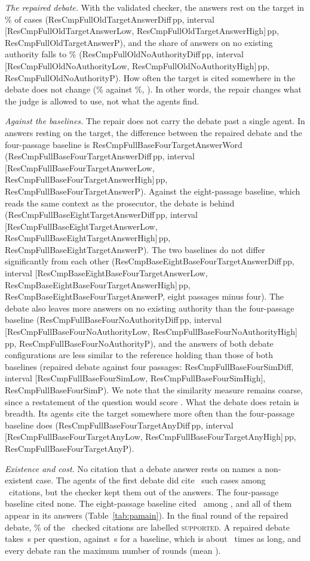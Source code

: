 \documentclass[conference]{IEEEtran}
\newcommand{\pp}{\,pp}
\newcommand{\cmp}[3]{\csname ResCmp#1#2Diff\endcsname#3, interval [\csname ResCmp#1#2Low\endcsname, \csname ResCmp#1#2High\endcsname]#3, \csname ResCmp#1#2P\endcsname}
\newcommand{\cmpword}[2]{\csname ResCmp#1#2Word\endcsname}
\begin{document}
\emph{The repaired debate.} With the validated checker, the answers rest on the target in \ResPaFullTargetAnswer\% of cases (\cmp{FullOld}{TargetAnswer}{\pp}), and the share of answers on no existing authority falls to \ResPaFullNoAuthority\% (\cmp{FullOld}{NoAuthority}{\pp}). How often the target is cited somewhere in the debate does not change (\ResPaFullTargetAny\% against \ResPaOldTargetAny\%, \ResCmpFullOldTargetAnyP). In other words, the repair changes what the judge is allowed to use, not what the agents find.

\emph{Against the baselines.} The repair does not carry the debate past a single agent. In answers resting on the target, the difference between the repaired debate and the four-passage baseline is \cmpword{FullBaseFour}{TargetAnswer} (\cmp{FullBaseFour}{TargetAnswer}{\pp}). Against the eight-passage baseline, which reads the same context as the prosecutor, the debate is behind (\cmp{FullBaseEight}{TargetAnswer}{\pp}). The two baselines do not differ significantly from each other (\cmp{BaseEightBaseFour}{TargetAnswer}{\pp}, eight passages minus four). The debate also leaves more answers on no existing authority than the four-passage baseline (\cmp{FullBaseFour}{NoAuthority}{\pp}), and the answers of both debate configurations are less similar to the reference holding than those of both baselines (repaired debate against four passages: \cmp{FullBaseFour}{Sim}{}). We note that the similarity measure remains coarse, since a restatement of the question would score \ResPaSimQuestion. What the debate does retain is breadth. Its agents cite the target somewhere more often than the four-passage baseline does (\cmp{FullBaseFour}{TargetAny}{\pp}).

\emph{Existence and cost.} No citation that a debate answer rests on names a non-existent case. The agents of the first debate did cite \ResPaOldNotFound\ such cases among \ResPaOldCitationsMade\ citations, but the checker kept them out of the answers. The four-passage baseline cited none. The eight-passage baseline cited \ResPaBaseEightNotFoundAnswerCount\ among \ResPaBaseEightAnswerCitations, and all of them appear in its answers (Table~\ref{tab:pamain}). In the final round of the repaired debate, \ResPaFullSupportShown\% of the \ResPaFullSupportChecked\ checked citations are labelled \textsc{supported}. A repaired debate takes \ResPaFullSecondsPerCase\,s per question, against \ResPaBaseFourSecondsPerCase\,s for a baseline, which is about \ResPaFullTimeRatio\ times as long, and every debate ran the maximum number of rounds (mean \ResPaFullRounds).
\end{document}
